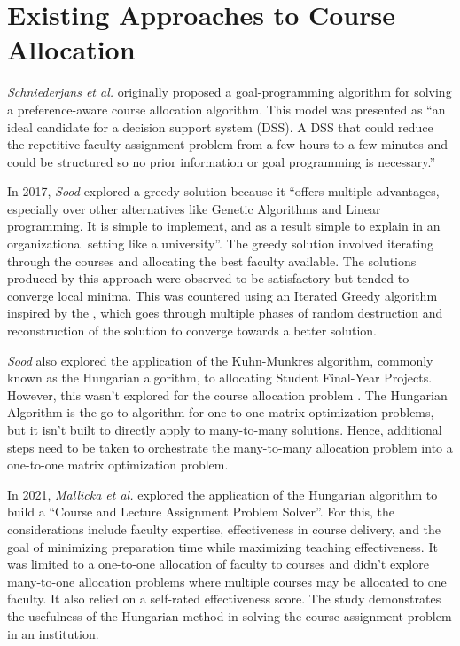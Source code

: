\section{Existing Approaches to Course Allocation}

\textit{Schniederjans et al.} \cite{schniederjans1987goal} originally proposed a goal-programming algorithm for solving a preference-aware course allocation algorithm. This model was presented as ``an ideal candidate for a decision support system (DSS). A DSS that could reduce the repetitive faculty assignment problem from a few hours to a few minutes and could be structured so no prior information or goal programming is necessary.''

In 2017, \textit{Sood} \cite{rohan2017} explored a greedy solution because it ``offers multiple advantages, especially over other alternatives like Genetic Algorithms and Linear programming. It is simple to implement, and as a result simple to explain in an organizational setting like a university''. The greedy solution involved iterating through the courses and allocating the best faculty available. The solutions produced by this approach were observed to be satisfactory but tended to converge local minima. This was countered using an Iterated Greedy algorithm inspired by the \cite{ruiz2007simple}, which goes through multiple phases of random destruction and reconstruction of the solution to converge towards a better solution.

\textit{Sood} also explored the application of the Kuhn-Munkres algorithm, commonly known as the Hungarian algorithm, to allocating Student Final-Year Projects. However, this wasn't explored for the course allocation problem \cite{rohan2017}. The Hungarian Algorithm \cite{munkres1957algorithms} is the go-to algorithm for one-to-one matrix-optimization problems, but it isn't built to directly apply to many-to-many solutions. Hence, additional steps need to be taken to orchestrate the many-to-many allocation problem into a one-to-one matrix optimization problem.

In 2021, \textit{Mallicka et al.} \cite{mallicka2021claps} explored the application of the Hungarian algorithm to build a ``Course and Lecture Assignment Problem Solver''. For this, the considerations include faculty expertise, effectiveness in course delivery, and the goal of minimizing preparation time while maximizing teaching effectiveness. It was limited to a one-to-one allocation of faculty to courses and didn't explore many-to-one allocation problems where multiple courses may be allocated to one faculty. It also relied on a self-rated effectiveness score. The study demonstrates the usefulness of the Hungarian method in solving the course assignment problem in an institution.

